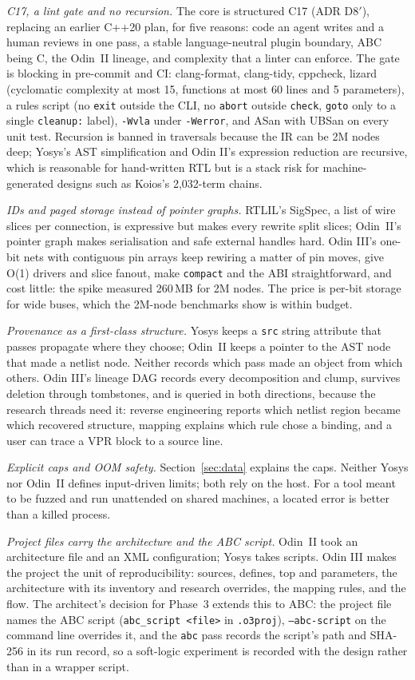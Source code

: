 \documentclass[conference]{IEEEtran}
\newcommand{\code}[1]{\texttt{#1}}
\begin{document}
\emph{C17, a lint gate and no recursion.} The core is structured C17 (ADR D8$'$), replacing an
earlier C++20 plan, for five reasons: code an agent writes and a human reviews in one pass,
a stable language-neutral plugin boundary, ABC being C, the Odin~II lineage, and complexity
that a linter can enforce. The gate is blocking in pre-commit and CI: clang-format, clang-tidy, cppcheck, lizard
(cyclomatic complexity at most 15, functions at most 60 lines and 5 parameters), a rules script
(no \code{exit} outside the CLI, no \code{abort} outside \code{check}, \code{goto} only to a
single \code{cleanup:} label), \code{-Wvla} under \code{-Werror}, and ASan with UBSan on every
unit test. Recursion is
banned in traversals because the IR can be 2M nodes deep; Yosys's AST simplification and Odin
II's expression reduction are recursive, which is reasonable for hand-written RTL but is a stack
risk for machine-generated designs such as Koios's 2,032-term chains.

\emph{IDs and paged storage instead of pointer graphs.} RTLIL's SigSpec, a list of wire slices
per connection, is expressive but makes every rewrite split slices; Odin~II's pointer graph
makes serialisation and safe external handles hard. Odin III's one-bit nets with contiguous
pin arrays keep rewiring a matter of pin moves, give O(1) drivers and slice fanout, make
\code{compact} and the ABI straightforward, and cost little: the spike measured 260\,MB for 2M
nodes. The price is per-bit storage for wide buses, which the 2M-node benchmarks show is within
budget.

\emph{Provenance as a first-class structure.} Yosys keeps a \code{src} string attribute that
passes propagate where they choose; Odin~II keeps a pointer to the AST node that made a netlist
node. Neither records which pass made an object from which others. Odin III's lineage DAG
records every decomposition and clump, survives deletion through tombstones, and is queried in
both directions, because the research threads need it: reverse engineering reports which
netlist region became which recovered structure, mapping explains which rule chose a binding,
and a user can trace a VPR block to a source line.

\emph{Explicit caps and OOM safety.} Section~\ref{sec:data} explains the caps. Neither Yosys
nor Odin~II defines input-driven limits; both rely on the host. For a tool meant to be fuzzed
and run unattended on shared machines, a located error is better than a killed process.

\emph{Project files carry the architecture and the ABC script.} Odin~II took an architecture
file and an XML configuration; Yosys takes scripts. Odin III makes the project the unit of
reproducibility: sources, defines, top and parameters, the architecture with its inventory and
research overrides, the mapping rules, and the flow. The architect's decision for Phase~3 extends
this to ABC: the project file names the ABC script (\code{abc\_script <file>} in
\code{.o3proj}), \code{--abc-script} on the command line overrides it, and the \code{abc} pass
records the script's path and SHA-256 in its run record, so a soft-logic experiment is recorded
with the design rather than in a wrapper script.
\end{document}
